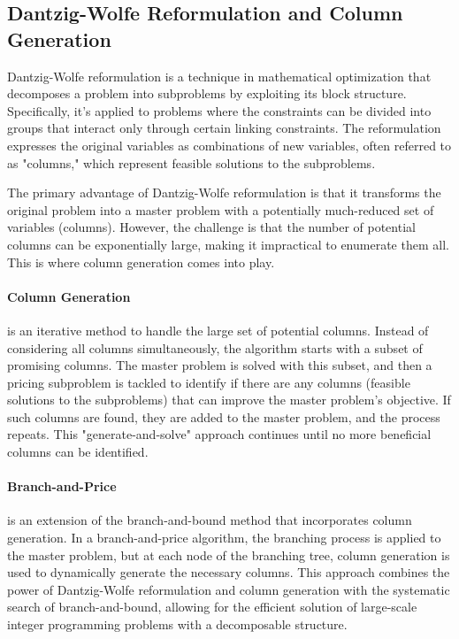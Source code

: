 \subsection{Dantzig-Wolfe Reformulation and Column Generation}

Dantzig-Wolfe reformulation is a technique in mathematical optimization that decomposes a problem into subproblems by exploiting its block structure. Specifically, it's applied to problems where the constraints can be divided into groups that interact only through certain linking constraints. The reformulation expresses the original variables as combinations of new variables, often referred to as "columns," which represent feasible solutions to the subproblems.

The primary advantage of Dantzig-Wolfe reformulation is that it transforms the original problem into a master problem with a potentially much-reduced set of variables (columns). However, the challenge is that the number of potential columns can be exponentially large, making it impractical to enumerate them all. This is where column generation comes into play.

\paragraph{Column Generation} is an iterative method to handle the large set of potential columns. Instead of considering all columns simultaneously, the algorithm starts with a subset of promising columns. The master problem is solved with this subset, and then a pricing subproblem is tackled to identify if there are any columns (feasible solutions to the subproblems) that can improve the master problem's objective. If such columns are found, they are added to the master problem, and the process repeats. This "generate-and-solve" approach continues until no more beneficial columns can be identified.

\paragraph{Branch-and-Price} is an extension of the branch-and-bound method that incorporates column generation. In a branch-and-price algorithm, the branching process is applied to the master problem, but at each node of the branching tree, column generation is used to dynamically generate the necessary columns. This approach combines the power of Dantzig-Wolfe reformulation and column generation with the systematic search of branch-and-bound, allowing for the efficient solution of large-scale integer programming problems with a decomposable structure.

